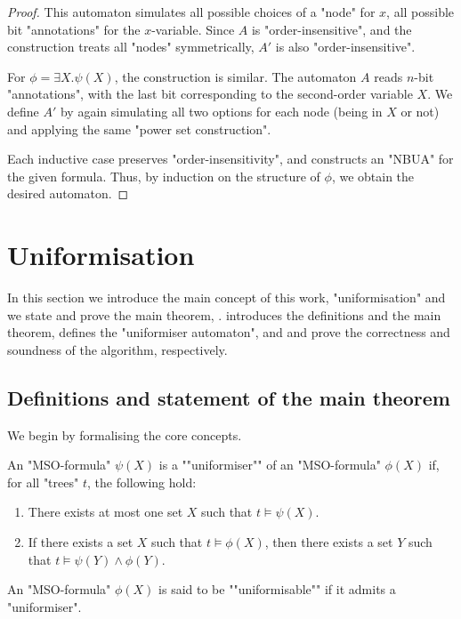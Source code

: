 \documentclass[a4paper,UKenglish,cleveref, autoref, thm-restate]{lipics-v2021}
\begin{document}
\begin{proof}
	This automaton simulates all possible choices of a "node" for $x$, \ie all possible  bit "annotations" for the $x$-variable.
	Since $A$ is "order-insensitive", and the construction treats all "nodes" symmetrically, $A'$ is also "order-insensitive".

	For $\phi = \exists X.\psi(X)$, the construction is similar. The automaton $A$ reads $n$-bit "annotations", with the last bit corresponding
	to the second-order variable $X$. We define $A'$ by again simulating all two options for each node (being in $X$ or not) and applying the same
	"power set construction".

	Each inductive case preserves "order-insensitivity", and constructs an "NBUA" for the given formula. Thus, by induction on the structure of $\phi$,
	we obtain the desired automaton.
\end{proof}


\section{Uniformisation}\label{sec:uniformisation}
In this section we introduce the main concept of this work, "uniformisation" and we state and prove the main theorem, .
 introduces the definitions and the main theorem,  defines the "uniformiser automaton",
and  and  prove the correctness and soundness of the algorithm, respectively.

\subsection{Definitions and statement of the main theorem}\label{section:uniformisation-definitions}

We begin by formalising the core concepts.

\begin{definition}\label{def:uniformiser}
	\AP An "MSO-formula" $\psi(X)$ is a ""uniformiser"" of an "MSO-formula" $\phi(X)$ if, for all "trees" $t$, the following hold:
	\begin{enumerate}
		\item There exists at most one set $X$ such that $t \models \psi(X)$.
		\item If there exists a set $X$ such that $t \models \phi(X)$, then there exists a set $Y$ such that $t \models \psi(Y) \land \phi(Y)$.
	\end{enumerate}
	\AP An "MSO-formula" $\phi(X)$ is said to be ""uniformisable"" if it admits a "uniformiser".
\end{definition}
\end{document}
